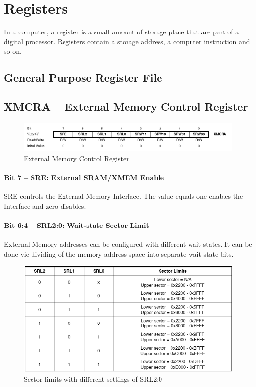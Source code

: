 \documentclass[english]{article}
\begin{document}
\section{Registers}
In a computer, a register is a small amount of storage place that are part of a digital processor. Registers contain a storage address, a computer instruction and so on.
\subsection{General Purpose Register File}
\subsection{XMCRA – External Memory Control Register }
\begin{figure}[H]
\centerline{\includegraphics[scale=0.8]{MicroLab1/37last}}
\caption{External Memory Control Register}
\end{figure}
 \paragraph{Bit 7 – SRE: External SRAM/XMEM Enable} SRE controls the External Memory Interface. The value equals one enables the Interface and zero disables.
\paragraph{Bit 6:4 – SRL2:0: Wait-state Sector Limit} External Memory addresses can be configured with different wait-states. It can be done vie dividing of the memory address space into separate wait-state bits. 
\begin{figure}[H]
\caption{Sector limits with different settings of SRL2:0}
\centerline{\includegraphics[scale=0.8]{MicroLab1/38p1}}
\end{figure}
\end{document}
